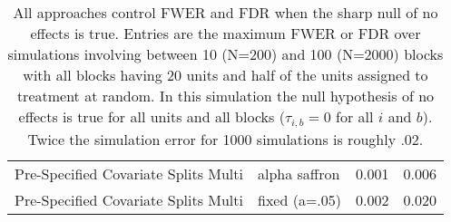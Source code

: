 \begin{table}[H]
\begin{tabular}{llrr}
  Pre-Specified Covariate Splits Multi & alpha saffron & 0.001 & 0.006 \\ 
  Pre-Specified Covariate Splits Multi & fixed (a=.05) & 0.002 & 0.020 \\ 
   \bottomrule
\end{tabular}
\caption{All approaches control FWER and FDR when the sharp null of no
  effects is true. Entries are the maximum FWER or FDR over simulations
  involving between 10 (N=200) and 100 (N=2000) blocks with all blocks
having 20 units and half of the units assigned
to treatment at random. In this simulation the null
  hypothesis of no effects is true for all units and all blocks ($\tau_{i,b} =
  0$ for all $i$ and $b$). Twice the simulation error for 1000 simulations is
  roughly .02.} 
\label{tab:weak_fwer_control}
\end{table}
